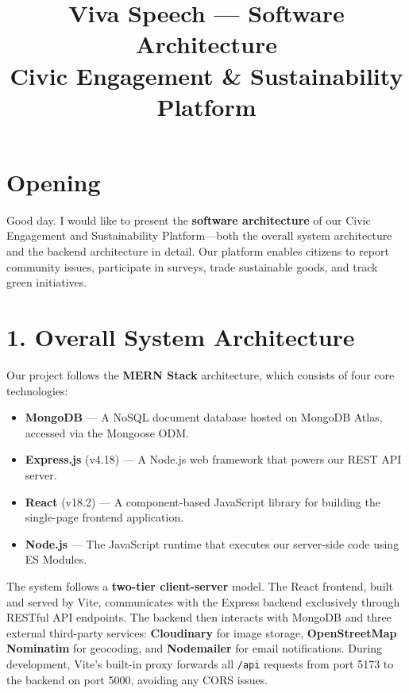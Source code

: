 \documentclass[12pt,a4paper]{article}
\title{\textbf{Viva Speech --- Software Architecture}\\[4pt]
\large Civic Engagement \& Sustainability Platform}
\author{}
\date{}
\begin{document}
\maketitle
\thispagestyle{empty}


\section*{Opening}

Good day. I would like to present the \textbf{software architecture} of our Civic Engagement and Sustainability Platform---both the overall system architecture and the backend architecture in detail. Our platform enables citizens to report community issues, participate in surveys, trade sustainable goods, and track green initiatives.

\section{1. Overall System Architecture}

Our project follows the \textbf{MERN Stack} architecture, which consists of four core technologies:

\begin{itemize}[nosep]
    \item \textbf{MongoDB} --- A NoSQL document database hosted on MongoDB Atlas, accessed via the Mongoose ODM.
    \item \textbf{Express.js} (v4.18) --- A Node.js web framework that powers our REST API server.
    \item \textbf{React} (v18.2) --- A component-based JavaScript library for building the single-page frontend application.
    \item \textbf{Node.js} --- The JavaScript runtime that executes our server-side code using ES Modules.
\end{itemize}

The system follows a \textbf{two-tier client-server} model. The React frontend, built and served by Vite, communicates with the Express backend exclusively through RESTful API endpoints. The backend then interacts with MongoDB and three external third-party services: \textbf{Cloudinary} for image storage, \textbf{OpenStreetMap Nominatim} for geocoding, and \textbf{Nodemailer} for email notifications. During development, Vite's built-in proxy forwards all \texttt{/api} requests from port 5173 to the backend on port 5000, avoiding any CORS issues.
\end{document}
